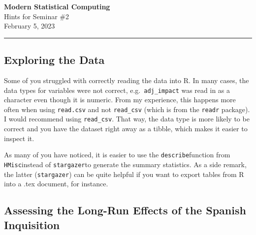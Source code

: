 \documentclass[
]{report}
\author{}
\date{February 5, 2023}
\begin{document}
\ifdefined\Shaded\renewenvironment{Shaded}{\begin{tcolorbox}[breakable, sharp corners, borderline west={3pt}{0pt}{shadecolor}, interior hidden, frame hidden, enhanced, boxrule=0pt]}{\end{tcolorbox}}\fi

\begin{center}\vspace{0.3cm}
\textbf{\Large Modern Statistical Computing} \\
\vspace{5pt} {\large Hints for Seminar \#2} \\
\vspace{5pt} {\large February 5, 2023} \\
\end{center}

\flushleft

\rule{\linewidth}{0.1mm}

\subsection{Exploring the Data}

Some of you struggled with correctly reading the data into R. In many
cases, the data types for variables were not correct,
e.g.~\texttt{adj\_impact} was read in as a character even though it is
numeric. From my experience, this happens more often when using
\texttt{read.csv} and not \texttt{read\_csv} (which is from the
\texttt{readr} package). I would recommend using \texttt{read\_csv}.
That way, the data type is more likely to be correct and you have the
dataset right away as a tibble, which makes it easier to inspect it.

As many of you have noticed, it is easier to use the
\texttt{describe}function from \texttt{HMisc}instead of
\texttt{stargazer}to generate the summary statistics. As a side remark,
the latter (\texttt{stargazer}) can be quite helpful if you want to
export tables from R into a .tex document, for instance.

\subsection{Assessing the Long-Run Effects of the Spanish Inquisition}
\end{document}
